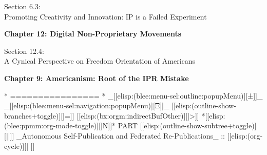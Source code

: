 \begin{whenOrg}
\begin{verblatex}
\begin{frame}[fragile,plain,label=citation_nonAmericanist]
    \bigskip

  \begin{large}
Section 6.3:\\[10pt] Promoting Creativity and Innovation: IP is a Failed Experiment
  \end{large}

    \bigskip

   \begin{center}
      \begin{large}
        \textbf{Chapter 12: Digital Non-Proprietary Movements}
      \end{large}
  \end{center}

  \begin{large}
Section 12.4:\\[10pt] A Cynical Perspective on Freedom Orientation of Americans
  \end{large}

    \bigskip

    \begin{center}
      \begin{large}
        \textbf{Chapter 9: Americanism: Root of the IPR Mistake}
      \end{large}
  \end{center}



\end{frame}
\end{verblatex}


\begin{whenOrg}
*      ================
*  _[[elisp:(blee:menu-sel:outline:popupMenu)][±]]_ _[[elisp:(blee:menu-sel:navigation:popupMenu)][Ξ]]_ [[elisp:(outline-show-branches+toggle)][|=]] [[elisp:(bx:orgm:indirectBufOther)][|>]] *[[elisp:(blee:ppmm:org-mode-toggle)][|N]]*  PART       [[elisp:(outline-show-subtree+toggle)][||]]   _Autonomous Self-Publication and Federated Re-Publications_ ::  [[elisp:(org-cycle)][| ]]
\end{whenOrg}


\end{whenOrg}
